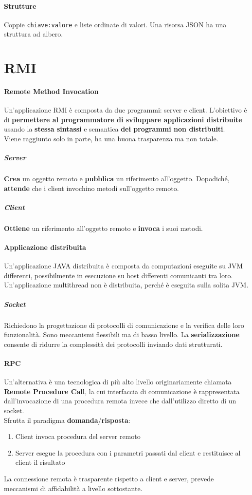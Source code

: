 \documentclass[10pt]{article}
\begin{document}
\paragraph{Strutture} Coppie \texttt{chiave:valore} e liste ordinate di valori. Una risorsa JSON ha una struttura ad albero.
\section{RMI}
\paragraph{Remote Method Invocation} Un'applicazione RMI è composta da due programmi: server e client. L'obiettivo è di \textbf{permettere al programmatore di sviluppare applicazioni distribuite} usando la \textbf{stessa sintassi} e semantica \textbf{dei programmi non distribuiti}.\\
Viene raggiunto solo in parte, ha una buona trasparenza ma non totale.
\subparagraph{Server} \textbf{Crea} un oggetto remoto e \textbf{pubblica} un riferimento all'oggetto. Dopodiché, \textbf{attende} che i client invochino metodi sull'oggetto remoto.
\subparagraph{Client} \textbf{Ottiene} un riferimento all'oggetto remoto e \textbf{invoca} i suoi metodi.
\paragraph{Applicazione distribuita} Un'applicazione JAVA distribuita è composta da computazioni eseguite su JVM differenti, possibilmente in esecuzione su host differenti comunicanti tra loro. Un'applicazione multithread non è distribuita, perché è eseguita sulla solita JVM.
\subparagraph{Socket} Richiedono la progettazione di protocolli di comunicazione e la verifica delle loro funzionalità. Sono meccanismi flessibili ma di basso livello. La \textbf{serializzazione} consente di ridurre la complessità dei protocolli inviando dati strutturati.
\paragraph{RPC} Un'alternativa è una tecnologica di più alto livello originariamente chiamata \textbf{Remote Procedure Call}, la cui interfaccia di comunicazione è rappresentata dall'invocazione di una procedura remota invece che dall'utilizzo diretto di un socket.\\
Sfrutta il paradigma \textbf{domanda}/\textbf{risposta}:
\begin{enumerate}
	\item Client invoca procedura del server remoto
	\item Server esegue la procedura con i parametri passati dal client e restituisce al client il risultato
\end{enumerate}
La connessione remota è trasparente rispetto a client e server, prevede meccanismi di affidabilità a livello sottostante.
\end{document}
